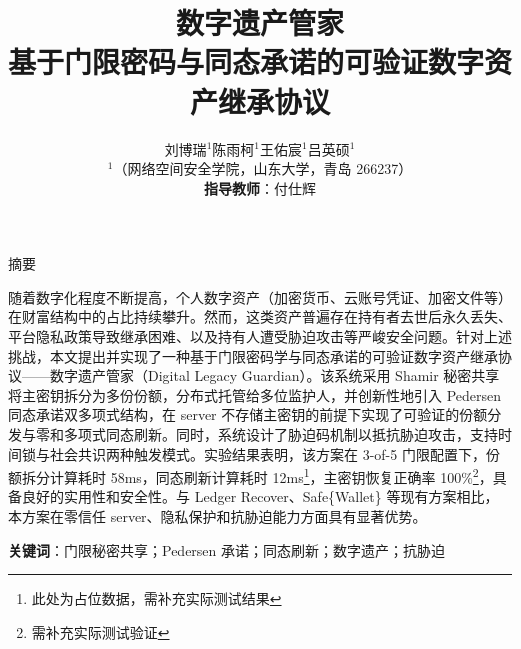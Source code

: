 \documentclass[12pt,a4paper,UTF8]{ctexart}
\title{\heiti\Large 数字遗产管家\\[8pt]
       \small 基于门限密码与同态承诺的可验证数字资产继承协议}
\author{
    刘博瑞$^{1}$\quad 陈雨柯$^{1}$\quad 王佑宸$^{1}$\quad 吕英硕$^{1}$ \\
    \small $^{1}$（网络空间安全学院，山东大学，青岛 266237） \\[4pt]
    \small \textbf{指导教师}：付仕辉
}
\date{}
\begin{document}
\maketitle
\thispagestyle{fancy}

\begin{center}
    \heiti\large 摘要
\end{center}

\noindent 随着数字化程度不断提高，个人数字资产（加密货币、云账号凭证、加密文件等）在财富结构中的占比持续攀升。然而，这类资产普遍存在持有者去世后永久丢失、平台隐私政策导致继承困难、以及持有人遭受胁迫攻击等严峻安全问题。针对上述挑战，本文提出并实现了一种基于门限密码学与同态承诺的可验证数字资产继承协议——数字遗产管家（Digital Legacy Guardian）。该系统采用 Shamir 秘密共享将主密钥拆分为多份份额，分布式托管给多位监护人，并创新性地引入 Pedersen 同态承诺双多项式结构，在 server 不存储主密钥的前提下实现了可验证的份额分发与零和多项式同态刷新。同时，系统设计了胁迫码机制以抵抗胁迫攻击，支持时间锁与社会共识两种触发模式。实验结果表明，该方案在 3-of-5 门限配置下，份额拆分计算耗时 58ms，同态刷新计算耗时 12ms\footnote{此处为占位数据，需补充实际测试结果}，主密钥恢复正确率 100\%\footnote{需补充实际测试验证}，具备良好的实用性和安全性。与 Ledger Recover、Safe\{Wallet\} 等现有方案相比，本方案在零信任 server、隐私保护和抗胁迫能力方面具有显著优势。

\vspace{0.5em}
\noindent \textbf{关键词}：门限秘密共享；Pedersen 承诺；同态刷新；数字遗产；抗胁迫

\newpage
\tableofcontents
\newpage









\newpage


\end{document}
